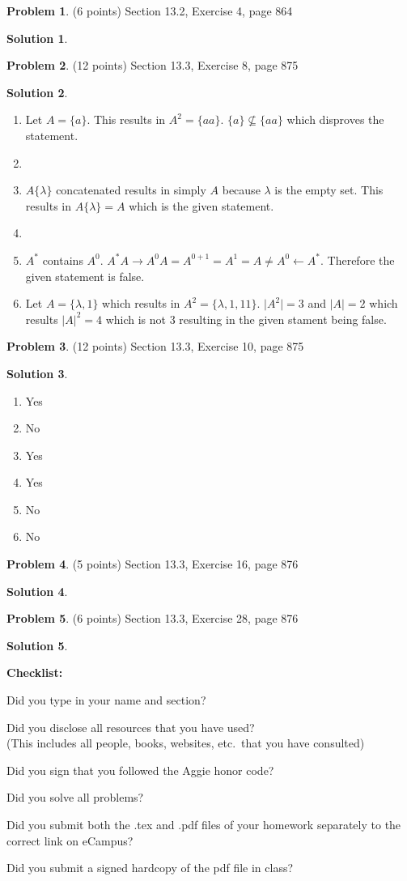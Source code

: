 \documentclass{article}
\theoremstyle{definition}
\newtheorem{problem}{Problem}
\newtheorem*{solution}{Solution}
\newcommand{\checklist}{\noindent\textbf{Checklist:}
\begin{compactitem}[$\Box$] 
\item Did you type in your name and section? 
\item Did you disclose all resources that you have used? \\
(This includes all people, books, websites, etc.\ that you have consulted)
\item Did you sign that you followed the Aggie honor code? 
\item Did you solve all problems? 
\item Did you submit both the .tex and .pdf files of your homework separately 
to the correct link on eCampus?
\item Did you submit a signed hardcopy of the pdf file in class? 
\end{compactitem}
}
\begin{document}
\begin{problem} (6 points)
Section 13.2, Exercise 4, page 864
\end{problem}
\begin{solution} \ \\
 
\end{solution}

\begin{problem} (12 points)
Section 13.3, Exercise 8, page 875
\end{problem}
\begin{solution} \ \\
\begin{enumerate}
  \item Let $ A = \{ a \} $. This results in $A^2 = \{ aa \}$. $\{ a \} \nsubseteq \{ aa \} $ which disproves the statement.
  
  \item 
  
  \item $A\{\lambda \}$ concatenated results in simply $A$ because $\lambda$ is the empty set.
  This results in $A\{\lambda \} = A$ which is the given statement.
  
  \item 
  
  \item $A^*$ contains $A^0$. $A^* A \rightarrow A^0 A = A^{0+1} = A^1 = A \neq A^0 \leftarrow A^*$. Therefore the given statement is false.  
  
  \item
  Let $A = \{\lambda, 1 \}$ which results in $A^2 = \{\lambda, 1, 11 \}$. $\vert A^2 \vert = 3$ and $\vert A \vert = 2$ which results $\vert A \vert ^2 = 4$ which is not 3 resulting in the given stament being false.
\end{enumerate}
\end{solution}

\begin{problem} (12 points)
Section 13.3, Exercise 10, page 875
\end{problem}
\begin{solution} \ \\
\begin{enumerate}
  \item Yes
  \item No
  \item Yes
  \item Yes
  \item No
  \item No
\end{enumerate}
\end{solution}

\begin{problem} (5 points)
Section 13.3, Exercise 16, page 876
\end{problem}
\begin{solution} 
\end{solution}

\begin{problem} (6 points)
Section 13.3, Exercise 28, page 876
\end{problem}
\begin{solution} 
\end{solution}

\goodbreak
\checklist
\end{document}
